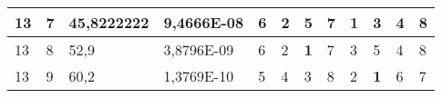 \documentclass[conference]{IEEEtran}
\begin{document}
\begin{table*}[]
\begin{tabular}{|llll|llllllll|}
\multicolumn{1}{|l|}{13}                                                    & \multicolumn{1}{l|}{7}                                                        & \multicolumn{1}{l|}{45,8222222}                                                   & 9,4666E-08                     & \multicolumn{1}{l|}{6}                                                  & \multicolumn{1}{l|}{2}                                                  & \multicolumn{1}{l|}{5}                                                  & \multicolumn{1}{l|}{7}                                                  & \multicolumn{1}{l|}{\textbf{1}}                                         & \multicolumn{1}{l|}{3}                                                  & \multicolumn{1}{l|}{4}                                                  & 8                          \\ \hline
\multicolumn{1}{|l|}{13}                                                    & \multicolumn{1}{l|}{8}                                                        & \multicolumn{1}{l|}{52,9}                                                         & 3,8796E-09                     & \multicolumn{1}{l|}{6}                                                  & \multicolumn{1}{l|}{2}                                                  & \multicolumn{1}{l|}{\textbf{1}}                                         & \multicolumn{1}{l|}{7}                                                  & \multicolumn{1}{l|}{3}                                                  & \multicolumn{1}{l|}{5}                                                  & \multicolumn{1}{l|}{4}                                                  & 8                          \\ \hline
\multicolumn{1}{|l|}{13}                                                    & \multicolumn{1}{l|}{9}                                                        & \multicolumn{1}{l|}{60,2}                                                         & 1,3769E-10                     & \multicolumn{1}{l|}{5}                                                  & \multicolumn{1}{l|}{4}                                                  & \multicolumn{1}{l|}{3}                                                  & \multicolumn{1}{l|}{8}                                                  & \multicolumn{1}{l|}{2}                                                  & \multicolumn{1}{l|}{\textbf{1}}                                         & \multicolumn{1}{l|}{6}                                                  & 7                          \\ \hline

\end{tabular}
\end{table*}
\end{document}
